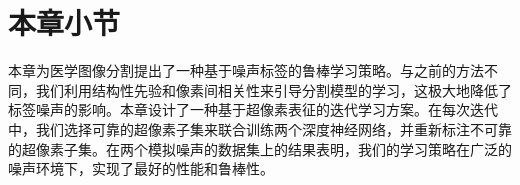 


\section{本章小节}
本章为医学图像分割提出了一种基于噪声标签的鲁棒学习策略。与之前的方法不同，我们利用结构性先验和像素间相关性来引导分割模型的学习，这极大地降低了标签噪声的影响。本章设计了一种基于超像素表征的迭代学习方案。在每次迭代中，我们选择可靠的超像素子集来联合训练两个深度神经网络，并重新标注不可靠的超像素子集。在两个模拟噪声的数据集上的结果表明，我们的学习策略在广泛的噪声环境下，实现了最好的性能和鲁棒性。
